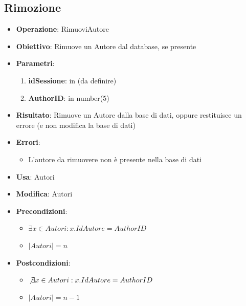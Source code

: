 \documentclass[a4paper,11pt]{article}
\begin{document}
\subsection{Rimozione}
\begin{itemize}
	\item \textbf{Operazione}: RimuoviAutore
	\item \textbf{Obiettivo}: Rimuove un Autore dal database, se presente
	\item \textbf{Parametri}:
	\begin{enumerate}
		\item \textbf{idSessione}: in (da definire)
		\item \textbf{AuthorID}: in number(5)
	\end{enumerate}
	\item \textbf{Risultato}: Rimuove un Autore dalla base di dati, oppure restituisce un errore (e non modifica la base di dati)
	\item \textbf{Errori}: 
	\begin{itemize}
		\item L'autore da rimuovere non è presente nella base di dati
	\end{itemize}
	\item \textbf{Usa}: Autori
	\item \textbf{Modifica}: Autori
	\item \textbf{Precondizioni}:
	\begin{itemize}
		\item $\exists x \in Autori : x.IdAutore = AuthorID$
		\item $|Autori| = n$
	\end{itemize}
	\item \textbf{Postcondizioni}:
	\begin{itemize}
		\item $\not\exists x \in Autori : x.IdAutore = AuthorID$
		\item $|Autori| = n - 1$
	\end{itemize}
\end{itemize}

\end{document}
